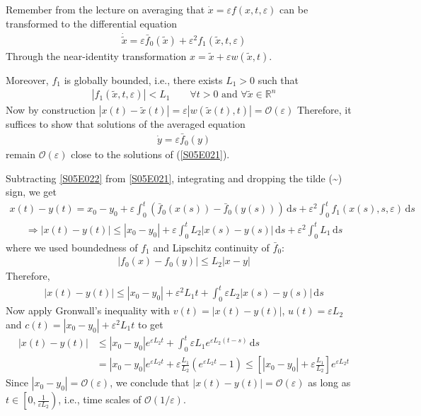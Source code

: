 \begin{solution}[6.1]
Remember from the lecture on averaging that $\dot{x} = \varepsilon f(x,t, \varepsilon)$ can be transformed to the differential equation
\begin{align}\label{S05E021}
	\dot{\tilde{x}} = \varepsilon \bar{f}_0(\tilde{x}) + \varepsilon^2f_1(\tilde{x},t,\varepsilon)
\end{align}
Through the near-identity transformation $x = \tilde{x} + \varepsilon w(\tilde{x},t)$.

Moreover, $f_1$ is globally bounded, i.e., there exists $L_1 > 0$ such that
\begin{align}
	|f_1(\tilde{x},t,\varepsilon)| < L_1 \qquad \forall t > 0 \text{ and } \forall \tilde{x}\in \mathbb{R}^n
\end{align}
Now by construction $|x(t) - \tilde{x}(t)| = \varepsilon|w(\tilde{x}(t),t)| = \mathcal{O}(\varepsilon)$
Therefore, it suffices to show that solutions of the averaged equation
\begin{align}\label{S05E022}
	\dot{y} = \varepsilon \bar{f}_0(y)
\end{align}
remain $\mathcal{O}(\varepsilon)$ close to the solutions of (\ref{S05E021}).

Subtracting \eqref{S05E022} from \eqref{S05E021}, integrating and dropping the tilde (\textasciitilde) sign, we get 
\begin{align}
	x(t) - y(t) = x_0 - y_0 + \varepsilon \int_0^t \left( \bar{f}_0(x(s)) - \bar{f}_0(y(s)) \right) \, \text{d}s + \varepsilon^2 \int_0^t f_1(x(s),s,\varepsilon) \, \text{d}s
\end{align}
\begin{align}
	\Longrightarrow |x(t) - y(t)| \leq |x_0 - y_0| + \varepsilon \int_0^t L_2|x(s) - y(s)|\,\text{d}s + \varepsilon^2 \int_0^t L_1 \,\text{d}s
\end{align}
where we used boundedness of $f_1$ and Lipschitz continuity of $\bar{f}_0$:
\begin{align}
	|f_0(x) - f_0(y)| \leq L_2 |x - y|
\end{align}
Therefore,
\begin{align}\label{S05E023}
	|x(t) - y(t)| \leq |x_0 - y_0| + \varepsilon^2 L_1t + \int_0^t \varepsilon L_2 |x(s) - y(s)|\,\text{d}s
\end{align}
Now apply Gronwall's inequality with $v(t) = |x(t) - y(t)|$, $u(t) = \varepsilon L_2$ and $c(t) = |x_0 - y_0| + \varepsilon^2 L_1t$ to get
\begin{align}
	|x(t) - y(t)| &\leq |x_0 - y_0|e^{\varepsilon L_2 t} + \int_0^t \varepsilon L_1 e^{\varepsilon L_2 (t-s)}\,\text{d}s \\
	&= |x_0 - y_0|e^{\varepsilon L_2 t} + \varepsilon \frac{L_1}{L_2} \left( e^{\varepsilon L_2 t} -1 \right) \leq \left[ |x_0 - y_0| + \varepsilon \frac{L_1}{L_2} \right] e^{\varepsilon L_2 t}
\end{align}
Since $|x_0 - y_0| = \mathcal{O}(\varepsilon)$, we conclude that $|x(t) - y(t)|= \mathcal{O}(\varepsilon)$ as long as $t\in \left[0,\frac{1}{\varepsilon L_2}\right)$, i.e., time scales of $\mathcal{O}(1/\varepsilon)$.
\end{solution}



